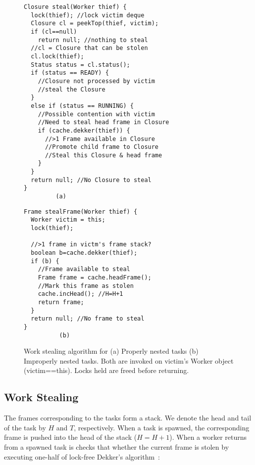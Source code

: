 \begin{figure*}
\begin{minipage}{0.5\textwidth}
\begin{verbatim}
Closure steal(Worker thief) {
  lock(thief); //lock victim deque
  Closure cl = peekTop(thief, victim);
  if (cl==null) 
    return null; //nothing to steal
  //cl = Closure that can be stolen
  cl.lock(thief);
  Status status = cl.status();
  if (status == READY) {
    //Closure not processed by victim
    //steal the Closure
  }
  else if (status == RUNNING) {
    //Possible contention with victim
    //Need to steal head frame in Closure
    if (cache.dekker(thief)) {
      //>1 Frame available in Closure
      //Promote child frame to Closure 
      //Steal this Closure & head frame
    } 
  }
  return null; //No Closure to steal
}
         (a)
\end{verbatim}
\end{minipage}%
\begin{minipage}{0.5\textwidth}
\begin{verbatim}
Frame stealFrame(Worker thief) {
  Worker victim = this;
  lock(thief);

  //>1 frame in victm's frame stack?
  boolean b=cache.dekker(thief);
  if (b) {
    //Frame available to steal
    Frame frame = cache.headFrame();
    //Mark this frame as stolen
    cache.incHead(); //H=H+1
    return frame;
  }
  return null; //No frame to steal
}
          (b) 
\end{verbatim}
\end{minipage}
\caption{Work stealing algorithm for (a) Properly nested tasks (b)
  Improperly nested tasks. Both are invoked on victim's
  Worker object (victim==this). Locks held are freed before returning.}%
\label{fig:stealing-alg}
\end{figure*}



\subsection{Work Stealing}



The frames corresponding to the tasks form a stack. We denote the head
and tail of the task by $H$ and $T$, respectively. When a task is
spawned, the corresponding frame is pushed into the head of the stack
($H=H+1$). When a worker returns from a spawned task is checks that
whether the current frame is stolen by executing one-half of lock-free
Dekker's algorithm~\cite{}:

